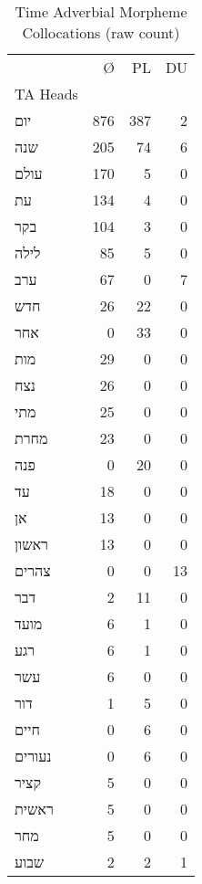 \begin{table}[htbp!]
\centering
\caption{Time Adverbial Morpheme Collocations (raw count)}
\label{table:morphcount}
\begin{tabular}{lrrr}
\toprule
{} &    Ø &   PL &  DU \\
TA Heads            &      &      &     \\
\midrule
\texthebrew{יום}    &  876 &  387 &   2 \\
\texthebrew{שנה}    &  205 &   74 &   6 \\
\texthebrew{עולם}   &  170 &    5 &   0 \\
\texthebrew{עת}     &  134 &    4 &   0 \\
\texthebrew{בקר}    &  104 &    3 &   0 \\
\texthebrew{לילה}   &   85 &    5 &   0 \\
\texthebrew{ערב}    &   67 &    0 &   7 \\
\texthebrew{חדש}    &   26 &   22 &   0 \\
\texthebrew{אחר}    &    0 &   33 &   0 \\
\texthebrew{מות}    &   29 &    0 &   0 \\
\texthebrew{נצח}    &   26 &    0 &   0 \\
\texthebrew{מתי}    &   25 &    0 &   0 \\
\texthebrew{מחרת}   &   23 &    0 &   0 \\
\texthebrew{פנה}    &    0 &   20 &   0 \\
\texthebrew{עד}     &   18 &    0 &   0 \\
\texthebrew{אן}     &   13 &    0 &   0 \\
\texthebrew{ראשון}  &   13 &    0 &   0 \\
\texthebrew{צהרים}  &    0 &    0 &  13 \\
\texthebrew{דבר}    &    2 &   11 &   0 \\
\texthebrew{מועד}   &    6 &    1 &   0 \\
\texthebrew{רגע}    &    6 &    1 &   0 \\
\texthebrew{עשר}    &    6 &    0 &   0 \\
\texthebrew{דור}    &    1 &    5 &   0 \\
\texthebrew{חיים}   &    0 &    6 &   0 \\
\texthebrew{נעורים} &    0 &    6 &   0 \\
\texthebrew{קציר}   &    5 &    0 &   0 \\
\texthebrew{ראשית}  &    5 &    0 &   0 \\
\texthebrew{מחר}    &    5 &    0 &   0 \\
\texthebrew{שבוע}   &    2 &    2 &   1 \\
\bottomrule
\end{tabular}
\end{table}
